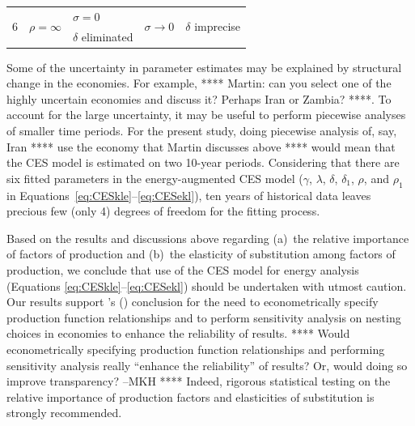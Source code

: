 \documentclass[preprint,authoryear,12pt]{elsarticle}\usepackage[]{graphicx}\usepackage[]{color}
\newcommand{\citeapos}[1]{\citeauthor{#1}'s (\citeyear{#1})} %
\begin{document}
\begin{table}
\begin{center}
\begin{tabular}{c c l c l}
      \multirow{2}{*}{6}
        & \multirow{2}{*}{$\rho = \infty$}
                         & $\sigma = 0$     & \multirow{2}{*}{$\sigma \rightarrow 0$}
                                                                       & \multirow{2}{*}{$\delta$\; imprecise} 
                                                                                    \\ [-1 mm]
%
        &                & $\delta$\; eliminated
                                            &                          &                      \\
      \bottomrule
    \end{tabular}
  \end{center}
\end{table}

Some of the uncertainty in parameter estimates may be explained by structural change in the economies. 
For example, 
**** Martin: can you select one of the highly uncertain economies and discuss it? 
Perhaps Iran or Zambia? ****. 
To account for the large uncertainty, 
it may be useful to perform piecewise analyses of smaller time periods. 
For the present study, doing piecewise analysis of, say, 
Iran **** use the economy that Martin discusses above **** 
would mean that the CES model is estimated on two 10-year periods. 
Considering that there are six fitted parameters in the energy-augmented CES model 
($\gamma$, $\lambda$, $\delta$, $\delta_1$, $\rho$, and $\rho_1$
in Equations~\ref{eq:CESkle}--\ref{eq:CESekl}), 
ten years of historical data leaves precious few 
(only 4) degrees of freedom for the fitting process. 

\vspace{5 mm}

Based on the results and discussions above 
regarding (a)~the relative importance of factors of production and 
(b)~the elasticity of substitution among factors of production, 
we conclude that use of the CES model for energy analysis 
(Equations \ref{eq:CESkle}--\ref{eq:CESekl})
should be undertaken with utmost caution. 
Our results support \citeapos{Lecca:2011kr} conclusion 
for the need to econometrically specify production function relationships and 
to perform sensitivity analysis on nesting choices in economies 
to enhance the reliability of results. 
**** Would econometrically specifying production function relationships and
performing sensitivity analysis really ``enhance the reliability'' of results? 
Or, would doing so improve transparency? --MKH ****
Indeed, rigorous statistical testing on the relative importance 
of production factors and elasticities of substitution is strongly recommended. 
\end{document}
